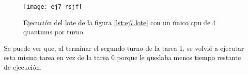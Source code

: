   \begin{figure}[H]
  		\centering
  		\texttt{[image: ej7-rsjf]}
  		\caption{Ejecución del lote de la figura \ref{lst:ej7.lote} con un \'unico cpu de 4 quantums por turno}
  		\label{fig:ej7.rsjf}
  \end{figure}

  Se puede ver que, al terminar el segundo turno de la tarea $1$, se volvió a ejecutar esta misma tarea en vez de la tarea $0$ porque le quedaba menos tiempo restante de ejecución.
